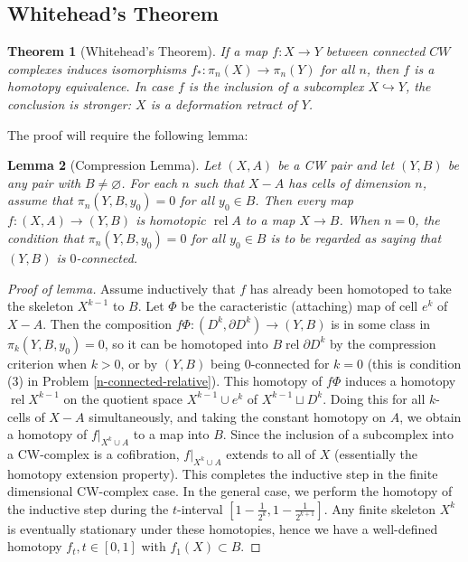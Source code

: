 \documentclass[reqno]{amsart}
\newtheorem{theorem}{Theorem}[section]
\newtheorem{lemma}[theorem]{Lemma}
\theoremstyle{definition}
\theoremstyle{remark}
\DeclareMathOperator{\rel}{rel}
\begin{document}
\subsection{Whitehead's Theorem}

\begin{theorem}[Whitehead's Theorem]\label{Thm:Whitehead}
    If a map $f \colon X \to Y$ between connected
    $CW$ complexes induces isomorphisms
    $f_* \colon \pi_n (X) \to \pi_n (Y)$ for all
    $n$, then $f$ is a homotopy equivalence.
    In case $f$ is the inclusion of a subcomplex
    $X \hookrightarrow Y$, the conclusion is stronger:
    $X$ is a deformation retract of $Y$.
\end{theorem}

The proof will require the following lemma:

\begin{lemma}[Compression Lemma]
    Let $\left( X,A \right) $ be a CW pair and let
    $\left( Y, B \right) $ be any pair with
    $B \neq \varnothing$. For each  $n$ such that
    $X - A$ has cells of dimension $n$, assume
    that  $\pi_n \left( Y, B, y_0 \right) = 0$ for
    all $y_0 \in B$. Then every map $f \colon
    \left( X,A \right) \to \left( Y,B \right) $ is homotopic
    $\rel A$ to a map $X \to B$.
    When $n = 0$, the condition that
    $\pi_n \left( Y,B,y_0 \right) =0$ for all
    $y_0 \in B$ is to be regarded as saying that
    $\left( Y,B \right) $ is $0$-connected.
\end{lemma}

\begin{proof}[Proof of lemma]
    Assume inductively that $f$ has already been
    homotoped to take the skeleton
    $X^{k-1}$ to $B$. Let
    $\Phi$ be the caracteristic (attaching) map of 
    cell $e^{k}$ of $X - A$. Then the composition
    $f \Phi \colon \left( D^{k} , \partial D^{k} \right) 
    \to \left( Y,B \right) $ is in some class
    in $\pi_k \left( Y, B, y_0 \right) = 0$, so
    it can be homotoped into $B \rel \partial D^{k}$ by
    the compression criterion when
    $k > 0$, or
    by $\left( Y,B \right) $ being $0$-connected for
    $k = 0$ (this is condition (3) in Problem \ref{n-connected-relative}).
    This homotopy of $f \Phi$ induces a homotopy
    $\rel X^{k-1}$ on the quotient space
    $X^{k-1} \cup e^{k}$ of $X^{k-1} \sqcup D^{k}$.
    Doing this for all $k$-cells of $X-A$ simultaneously, and
    taking the constant homotopy on $A$, we obtain a
    homotopy of $f|_{X^{k} \cup A}$ to a map into
    $B$. Since the inclusion of a
    subcomplex into a CW-complex is a cofibration,
    $f|_{X^{k} \cup  A}$ extends to all of $X$ (essentially
    the homotopy extension property).
    This completes the inductive step in the finite dimensional
    CW-complex case.
    In the general case, we perform the
    homotopy of the inductive step during the
    $t$-interval $\left[ 1- \frac{1}{2^{k}},
    1- \frac{1}{2^{k+1}}\right] $. Any finite skeleton
    $X^{k}$ is eventually stationary under these
    homotopies, hence we have a well-defined
    homotopy $f_t, t \in \left[ 0,1 \right] $ with
    $f_1 (X) \subset B$.
\end{proof}
\end{document}
